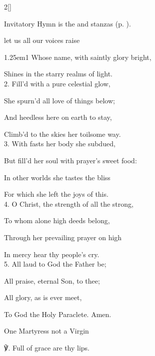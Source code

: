\begin{paracol}{2}[]

\begin{rubric}
	Invitatory Hymn is the  and  stanzas  (p. \pageref{VirginInvitatory}).
\end{rubric}

\vspace{-0.5\baselineskip}

\mattinsOfficeHymn\label{MartyressNotVirginMattins}

 let us all our voices raise


\begin{hangparas}{1.25em}{1}
Whose name, with saintly glory bright,

Shines in the starry realms of light.\\

2. Fill'd with a pure celestial glow,

She spurn'd all love of things below;

And heedless here on earth to stay,

Climb'd to the skies her toilsome way.\\

3. With fasts her body she subdued,

But fill'd her soul with prayer's sweet food:

In other worlds she tastes the bliss

For which she left the joys of this.\\

4. O Christ, the strength of all the strong,

To whom alone high deeds belong,

Through her prevailing prayer on high

In mercy hear thy people's cry.\\

5. All laud to God the Father be;

All praise, eternal Son, to thee;

All glory, as is ever meet,

To God the Holy Paraclete. Amen.
\end{hangparas}

\begin{inhead}
	One Martyress not a Virgin
\end{inhead}
℣. Full of grace are thy lips.


\end{paracol}
